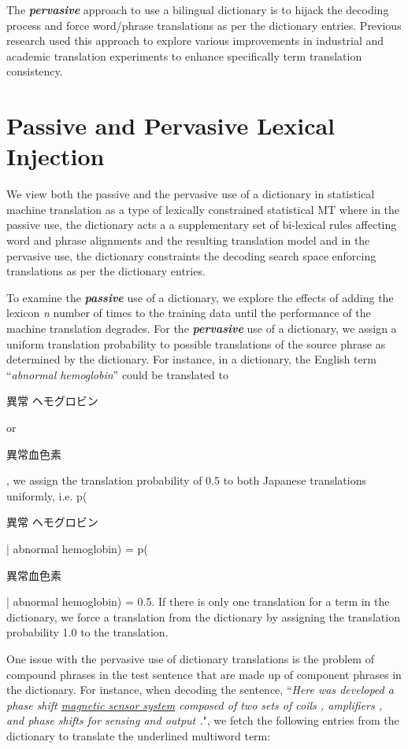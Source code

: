 The \textit{\textbf{pervasive}} approach to use a bilingual dictionary is to hijack the decoding process and force word/phrase translations as per the dictionary entries. Previous research used this approach to explore various improvements in industrial and academic translation experiments to enhance specifically term translation consistency.

\section{Passive and Pervasive Lexical Injection}

We view both the passive and the pervasive use of a dictionary in statistical machine translation as a type of lexically constrained statistical MT where in the passive use, the dictionary acts a a supplementary set of bi-lexical rules affecting word and phrase alignments and the resulting translation model and in the pervasive use, the dictionary constraints the decoding search space enforcing translations as per the dictionary entries. 

To examine the \textbf{\textit{passive}} use of a dictionary, we explore the effects of adding the lexicon \textit{n} number of times to the training data until the performance of the machine translation degrades. For the \textbf{\textit{pervasive}} use of a dictionary, we assign a uniform translation probability to possible translations of the source phrase as determined by the dictionary. For instance, in a dictionary, the English term ``\textit{abnormal hemoglobin}” could be translated to 
\begin{CJK*}{UTF8}{min}異常 ヘモグロビン\end{CJK*} or 
\begin{CJK*}{UTF8}{min}異常血色素\end{CJK*}, 
we assign the translation probability of 0.5 to both Japanese translations uniformly, i.e. p(\begin{CJK*}{UTF8}{min}異常 ヘモグロビン\end{CJK*} | abnormal hemoglobin) = p(\begin{CJK*}{UTF8}{min}異常血色素\end{CJK*} | abnormal hemoglobin) = 0.5. If there is only one translation for a term in the dictionary, we force a translation from the dictionary by assigning the translation probability 1.0 to the translation.

One issue with the pervasive use of dictionary translations is the problem of compound phrases in the test sentence that are made up of component phrases in the dictionary. For instance, when decoding the sentence, ``\textit{Here was developed a phase shift \underline{magnetic sensor system} composed of two sets of coils , amplifiers , and phase shifts for sensing and output .}", we fetch the following entries from the dictionary to translate the underlined multiword term:

